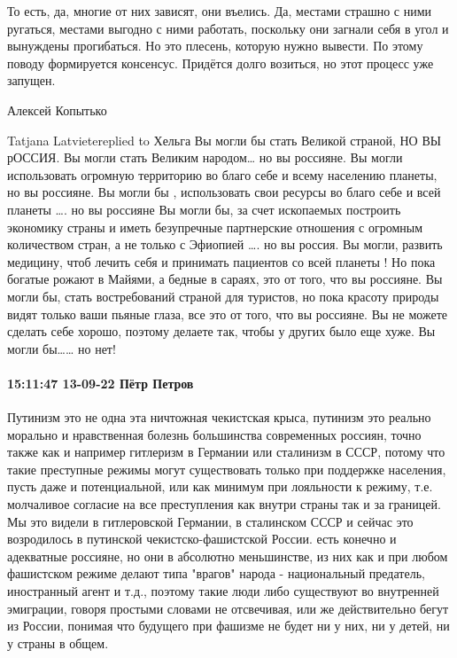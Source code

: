 То есть, да, многие от них зависят, они въелись. Да, местами страшно с ними ругаться, местами выгодно с ними работать, поскольку они загнали себя в угол и вынуждены прогибаться. Но это плесень, которую нужно вывести. По этому поводу формируется консенсус. Придётся долго возиться, но этот процесс уже запущен.

 Алексей Копытько


Tatjana Latvietereplied to Хельга
Вы могли бы стать Великой страной, НО ВЫ рОССИЯ.
Вы могли стать Великим народом… но вы россияне.
Вы могли использовать огромную территорию во благо себе и всему населению планеты, но вы россияне.
Вы могли бы , использовать свои ресурсы во благо себе и всей планеты …. но вы россияне
Вы могли бы, за счет ископаемых построить экономику страны и иметь безупречные партнерские отношения с огромным количеством стран, а не только с Эфиопией …. но вы россия.
Вы могли, развить медицину, чтоб лечить себя и принимать пациентов со всей планеты ! Но пока богатые рожают в Майями, а бедные в сараях, это от того, что вы россияне.
Вы могли бы, стать востребований страной для туристов, но пока красоту природы видят только ваши пьяные глаза, все это от того, что вы россияне.
Вы не можете сделать себе хорошо, поэтому делаете так, чтобы у других было еще хуже.
Вы могли бы…… но нет!

\paragraph{15:11:47 13-09-22 Пётр Петров}

Путинизм это не одна эта ничтожная чекистская крыса, путинизм это реально
морально и нравственная болезнь большинства современных россиян, точно также
как и например гитлеризм в Германии или сталинизм в СССР, потому что такие
преступные режимы могут существовать только при поддержке населения, пусть даже
и потенциальной, или как минимум при лояльности к режиму, т.е. молчаливое
согласие на все преступления как внутри страны так и за границей. Мы это видели
в гитлеровской Германии, в сталинском СССР и сейчас это возродилось в путинской
чекистско-фашистской России. есть конечно и адекватные россияне, но они в
абсолютно меньшинстве, из них как и при любом фашистском режиме делают типа
"врагов" народа - национальный предатель, иностранный агент и т.д., поэтому
такие люди либо существуют во внутренней эмиграции, говоря простыми словами не
отсвечивая, или же действительно бегут из России, понимая что будущего при
фашизме не будет ни у них, ни у детей, ни у страны в общем.

